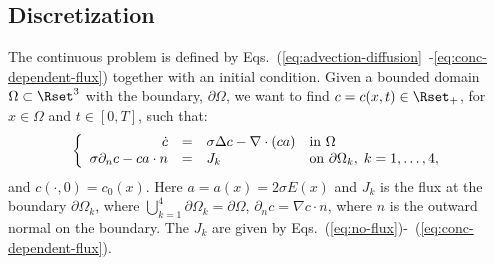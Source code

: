 \subsection*{Discretization}
\label{sec:discretization}
The continuous problem is defined by Eqs.~(\ref{eq:advection-diffusion}~-\ref{eq:conc-dependent-flux}) together with an initial condition. Given a bounded domain $\Omega \subset \Rset^3$ with the boundary, $\partial\Omega$, we want to find $c = c(x,t) \in \Rset_+$, for $x\in \Omega$ and $t \in [0,T]$, such that:
\begin{equation}
\label{eq:full_system}
\left\{
  \begin{array}{r@{\quad=\quad}ll}
    \dot{c}&\sigma\Delta c - \nabla\cdot\left(ca\right)&  \text{in } \Omega \\
    \sigma\partial_nc-ca\cdot n&J_k& \text{on } \partial\Omega_k,\; k = 1,\ldots,4,
  \end{array}
\right.
\end{equation}
and $c(\cdot,0) = c_0(x)$. Here $a=a(x)=2\sigma E(x)$ and $J_k$ is the \kth flux at the \kth boundary $\partial\Omega_k$, where $\bigcup^4_{k=1}\partial\Omega_k=\partial\Omega$, $\partial_nc = \nabla c\cdot n$, where $n$ is the outward normal on the boundary. The $J_k$ are given by Eqs.~(\ref{eq:no-flux})-~(\ref{eq:conc-dependent-flux}).\par

